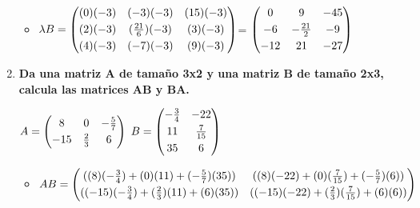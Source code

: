 \documentclass{report}
\begin{document}
\begin{enumerate}
\begin{itemize}
\vspace{.3cm}
\item $\lambda\/B=\begin{pmatrix}\vspace{.1cm} (0)(-3) & (-3)(-3) & (15)(-3)\\\vspace{.1cm} (2)(-3) & (\frac{21}{6})(-3) & (3)(-3)\\ (4)(-3) & (-7)(-3) & (9)(-3) \end{pmatrix}$\qquad =
$\begin{pmatrix}\vspace{.1cm} 0 & 9 & -45\\\vspace{.1cm} -6 & -\frac{21}{2} & -9\\ -12 & 21 & -27 \end{pmatrix}$
\end{itemize}
\item {\bfseries 
Da una matriz A de tamaño 3x2 y una matriz B de tamaño 2x3, calcula las matrices AB y BA.}

\vspace{.5cm}
$A=\begin{pmatrix}\vspace{.1cm} 8 & 0 & -\frac{5}{7} \\ -15 & \frac{2}{3} & 6 \end{pmatrix}$\qquad
$B=\begin{pmatrix}\vspace{.1cm} -\frac{3}{4} & -22 \\\vspace{.1cm} 11 & \frac{7}{15} \\ 35 & 6 \end{pmatrix}$
\begin{itemize}
    \item $AB=\begin{pmatrix}\vspace{.1cm}((8)(-\frac{3}{4})+ (0)(11)+ (-\frac{5}{7})(35)) & ((8)(-22)+(0)(\frac{7}{15})+(-\frac{5}{7})(6)) \\ ((-15)(-\frac{3}{4})+(\frac{2}{3})(11)+(6)(35)) & ((-15)(-22)+(\frac{2}{3})(\frac{7}{15})+(6)(6))\end{pmatrix}$
    

\end{itemize}
\end{enumerate}
\end{document}
